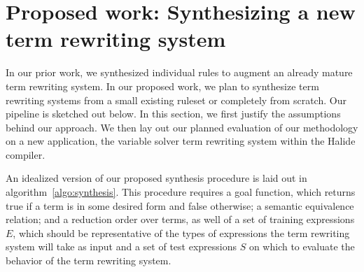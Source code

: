 \section{Proposed work: Synthesizing a new term rewriting system}
\label{proposed}

In our prior work, we synthesized individual rules to augment an already mature term rewriting system. In our proposed work, we plan to synthesize term rewriting systems from a small existing ruleset or completely from scratch. Our pipeline is sketched out below. In this section, we first justify the assumptions behind our approach. We then lay out our planned evaluation of our methodology on a new application, the variable solver term rewriting system within the Halide compiler.

An idealized version of our proposed synthesis procedure is laid out in algorithm~\ref{algo:synthesis}. This procedure requires a goal function, which returns true if a term is in some desired form and false otherwise; a semantic equivalence relation; and a reduction order over terms, as well of a set of training expressions $E$, which should be representative of the types of expressions the term rewriting system will take as input and a set of test expressions $S$ on which to evaluate the behavior of the term rewriting system.